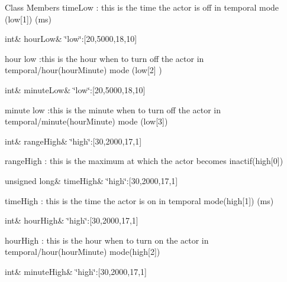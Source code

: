 \begin{DoxyFields}{Class Members}
time\+Low \+: this is the time the actor is off in temporal mode (low\mbox{[}1\mbox{]}) (ms) \\
\hline

\mbox{\label{class_jetpack_a9bd1b9e85800cfbec989ce40d1e9e08a}} 
int&
hourLow&
\char`\"{}low\char`\"{}\+:\mbox{[}20,5000,18,10\mbox{]}

hour low \+:this is the hour when to turn off the actor in temporal/hour(hour\+Minute) mode (low\mbox{[}2\mbox{]} ) \\
\hline

\mbox{\label{class_jetpack_aa699e25d802a00e86d3a8032ec48b88b}} 
int&
minuteLow&
\char`\"{}low\char`\"{}\+:\mbox{[}20,5000,18,10\mbox{]}

minute low \+:this is the minute when to turn off the actor in temporal/minute(hour\+Minute) mode (low\mbox{[}3\mbox{]}) \\
\hline

\mbox{\label{class_jetpack_ae330612c3da637654ecfa89d36620b93}} 
int&
rangeHigh&
\char`\"{}high\char`\"{}\+:\mbox{[}30,2000,17,1\mbox{]}

range\+High \+: this is the maximum at which the actor becomes inactif(high\mbox{[}0\mbox{]}) \\
\hline

\mbox{\label{class_jetpack_a97c594b20b03b46ae0a6ac544f5d6c8d}} 
unsigned long&
timeHigh&
\char`\"{}high\char`\"{}\+:\mbox{[}30,2000,17,1\mbox{]}

time\+High \+: this is the time the actor is on in temporal mode(high\mbox{[}1\mbox{]}) (ms) \\
\hline

\mbox{\label{class_jetpack_ace824f4ae57fa1a4a27b2c6477b350e3}} 
int&
hourHigh&
\char`\"{}high\char`\"{}\+:\mbox{[}30,2000,17,1\mbox{]}

hour\+High \+: this is the hour when to turn on the actor in temporal/hour(hour\+Minute) mode(high\mbox{[}2\mbox{]}) \\
\hline

\mbox{\label{class_jetpack_a8c26c18b0ec449b7545934cb01cca028}} 
int&
minuteHigh&
\char`\"{}high\char`\"{}\+:\mbox{[}30,2000,17,1\mbox{]}


\end{DoxyFields}
